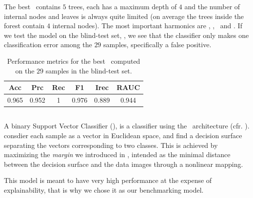 
The best \rf\ contains $5$ trees, each has a maximum depth of $4$ and the number of
internal nodes and leaves is always quite limited (on average the trees inside the forest contain
$4$ internal nodes). The most important harmonics are \cnmod[2], \cnmod[5], \phin[6]\ and \phin[10].
If we test the model on the blind-test set, \db, we see that the classifier only makes one classification error among the $29$ samples, specifically a false positive.
\begin{table}[!ht]
	\caption{Performance metrics for the best \rf\ computed on the $29$ samples in the
		blind-test set.}\label{tab:qrp-rf-test}

	\bigskip
	\setlength{\tabcolsep}{6pt}
	\centering
	\begin{tabular}{cccccc}
		\toprule
		\textbf{Acc} & \textbf{Prc} & \textbf{Rec} & \textbf{F1} & \textbf{Irec} & \textbf{RAUC} \\
		\midrule
		0.965        & 0.952        & 1            & 0.976       & 0.889         & 0.944         \\
		\bottomrule
	\end{tabular}
\end{table}

\subsection{\svc}
A binary Support Vector Classifier (\svc), is a classifier using the \svm\ architecture (cfr.
). \svcs consdier each sample as a vector in Euclidean space, and find a decision
surface separating the vectors corresponding to two classes. This is achieved by maximizing the
\emph{margin} we introduced in , intended as the minimal distance between the decision
surface and the data images through a nonlinear mapping.

This model is meant to have very high performance at the expense of explainability, that is why we chose it as our benchmarking model.

